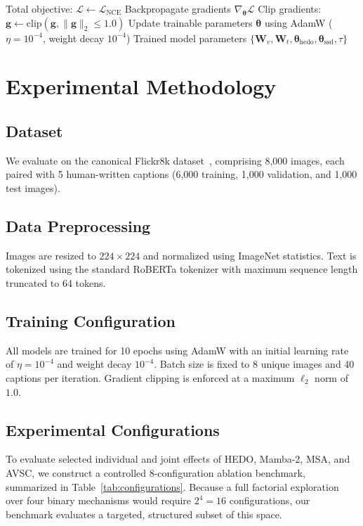 \documentclass[conference]{IEEEtran}
\begin{document}
\begin{algorithm}[htbp]
\begin{algorithmic}[1]
        \ELSE
            \STATE Total objective: $\mathcal{L} \leftarrow \mathcal{L}_{\mathrm{NCE}}$
        \ENDIF
        \STATE Backpropagate gradients $\nabla_{\boldsymbol{\theta}} \mathcal{L}$
        \STATE Clip gradients: $\mathbf{g} \leftarrow \mathrm{clip}(\mathbf{g}, \|\mathbf{g}\|_2 \le 1.0)$
        \STATE Update trainable parameters $\boldsymbol{\theta}$ using AdamW ($\eta = 10^{-4}$, weight decay $10^{-4}$)
    \ENDFOR
\ENDFOR
\RETURN Trained model parameters $\{\mathbf{W}_v, \mathbf{W}_t, \boldsymbol{\theta}_{\mathrm{hedo}}, \boldsymbol{\theta}_{\mathrm{ssd}}, \tau\}$
\end{algorithmic}
\end{algorithm}

\section{Experimental Methodology}
\label{sec:methodology}

\subsection{Dataset}
We evaluate on the canonical Flickr8k dataset~\cite{hodosh2013framing}, comprising 8,000 images, each paired with 5 human-written captions (6,000 training, 1,000 validation, and 1,000 test images).

\subsection{Data Preprocessing}
Images are resized to $224 \times 224$ and normalized using ImageNet statistics. Text is tokenized using the standard RoBERTa tokenizer with maximum sequence length truncated to 64 tokens.

\subsection{Training Configuration}
All models are trained for 10 epochs using AdamW with an initial learning rate of $\eta = 10^{-4}$ and weight decay $10^{-4}$. Batch size is fixed to 8 unique images and 40 captions per iteration. Gradient clipping is enforced at a maximum $\ell_2$ norm of $1.0$.

\subsection{Experimental Configurations}
To evaluate selected individual and joint effects of HEDO, Mamba-2, MSA, and AVSC, we construct a controlled 8-configuration ablation benchmark, summarized in Table~\ref{tab:configurations}. Because a full factorial exploration over four binary mechanisms would require $2^4 = 16$ configurations, our benchmark evaluates a targeted, structured subset of this space.
\end{document}
